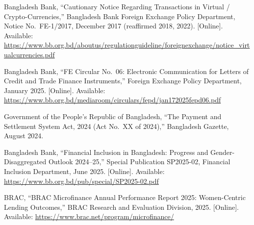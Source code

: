 \documentclass[12pt,a4paper]{report}
\begin{document}
{\begin{enumerate}[label={[\arabic*]}]
\item Bangladesh Bank, ``Cautionary Notice Regarding Transactions in Virtual / Crypto-Currencies,'' Bangladesh Bank Foreign Exchange Policy Department, Notice No.~FE-1/2017, December 2017 (reaffirmed 2018, 2022). [Online]. Available: \url{https://www.bb.org.bd/aboutus/regulationguideline/foreignexchange/notice_virtualcurrencies.pdf}

\item Bangladesh Bank, ``FE Circular No.~06: Electronic Communication for Letters of Credit and Trade Finance Instruments,'' Foreign Exchange Policy Department, January 2025. [Online]. Available: \url{https://www.bb.org.bd/mediaroom/circulars/fepd/jan172025fepd06.pdf}

\item Government of the People's Republic of Bangladesh, ``The Payment and Settlement System Act, 2024 (Act No.~XX of 2024),'' Bangladesh Gazette, August 2024.

\item Bangladesh Bank, ``Financial Inclusion in Bangladesh: Progress and Gender-Disaggregated Outlook 2024--25,'' Special Publication SP2025-02, Financial Inclusion Department, June 2025. [Online]. Available: \url{https://www.bb.org.bd/pub/special/SP2025-02.pdf}

\item BRAC, ``BRAC Microfinance Annual Performance Report 2025: Women-Centric Lending Outcomes,'' BRAC Research and Evaluation Division, 2025. [Online]. Available: \url{https://www.brac.net/program/microfinance/}

\end{enumerate}
}
\end{document}
